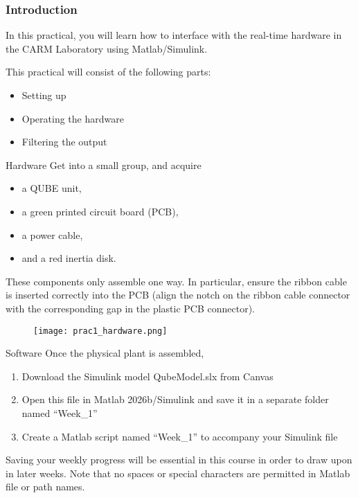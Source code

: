 \documentclass[9pt]{beamer-control}
\begin{document}

\begin{frame}
\frametitle{Introduction}
In this practical, you will learn how to interface with the real-time hardware in the CARM Laboratory using Matlab/Simulink.

\vfill

This practical will consist of the following parts:
\begin{itemize}
\item Setting up
\item Operating the hardware
\item Filtering the output
\end{itemize}
\end{frame}


\begin{frame}{Hardware}
Get into a small group, and acquire 
\vspace{-0.2cm}
\begin{itemize}
	\item a QUBE unit,
	\item a green printed circuit board (PCB),
	\item a power cable,
	\item and a red inertia disk.
\end{itemize}  
\vspace{-0.2cm}
These components only assemble one way. In particular, ensure the ribbon cable is inserted correctly into the PCB (align the notch on the ribbon cable connector with the corresponding gap in the plastic PCB connector).
\vspace{-0.2cm}
\begin{figure}
	\centering
	\texttt{[image: prac1\_hardware.png]}
\end{figure}


\end{frame}


\begin{frame}{Software}
Once the physical plant is assembled, 
\begin{enumerate}
\item Download the Simulink model QubeModel.slx from Canvas
\item Open this file in Matlab 2026b/Simulink and save it in a separate folder named “Week\_1”
\item Create a Matlab script named “Week\_1” to accompany your Simulink file
\end{enumerate}

Saving your weekly progress will be essential in this course in order to draw upon in later weeks. Note that no spaces or special characters are permitted in Matlab file or path names.

\end{frame}
\end{document}
